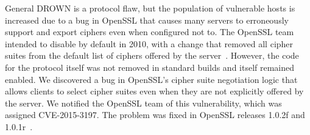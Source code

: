General DROWN is a protocol flaw, but the population of vulnerable hosts is
increased due to a bug in OpenSSL that causes many servers to erroneously
support \ssltwo and export ciphers even when configured not to. The OpenSSL
team intended to disable \ssltwo by default in 2010, with a change that removed
all \ssltwo cipher suites from the default list of ciphers offered by the
server~\cite{openssl-changelog}.  However, the code for the protocol itself was
not removed in standard builds and \ssltwo itself remained enabled. We
discovered a bug in OpenSSL's \ssltwo cipher suite negotiation logic that
allows clients to select \ssltwo cipher suites even when they are not
explicitly offered by the server. We notified the OpenSSL team of this
vulnerability, which was assigned CVE-2015-3197.  The problem was fixed in
OpenSSL releases 1.0.2f and 1.0.1r~\cite{openssl-changelog}.
